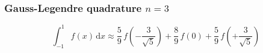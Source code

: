 \documentclass[10pt]{article}
\begin{document}
\begin{landscape}
\begin{multicols}{2}
\subsubsection{Gauss-Legendre quadrature $n = 3$}
\begin{equation}
    \int_{-1}^{1} f(x) \, \mathrm{d}x \approx
    \frac{5}{9} \, f\left(-\frac{3}{\sqrt{5}}\right) +
    \frac{8}{9} \, f\left(0\right) +
    \frac{5}{9} \, f\left(+\frac{3}{\sqrt{5}}\right)
\end{equation}

\end{multicols}
\end{landscape}
\end{document}
